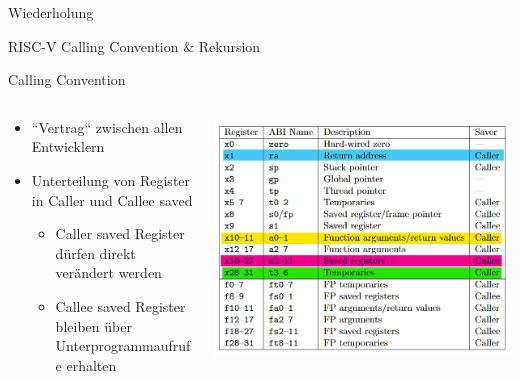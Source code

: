 \documentclass[
  german,            %
  aspectratio=169,    %
]{tumbeamer}
\begin{document}
\begin{frame}[c]{Wiederholung}{}
	\begin{center}
	  \LARGE RISC-V Calling Convention \& Rekursion
	\end{center}
\end{frame}

\begin{frame}[c]{Calling Convention}
	\begin{columns}[c]
	  \begin{column}{0.5\textwidth}
		\begin{itemize}
		  \item ``Vertrag`` zwischen allen Entwicklern
		  \item Unterteilung von Register in Caller und Callee saved
		  \begin{itemize}
			\item Caller saved Register dürfen direkt verändert werden
			\item Callee saved Register bleiben über Unterprogrammaufrufe erhalten
		  \end{itemize} 
		\end{itemize}
	  \end{column}
	  \begin{column}{0.5\textwidth}
		\includegraphics[width=\linewidth]{w03_calling_conv_regs.png}
	  \end{column}
	\end{columns}
  \end{frame}
  
\end{document}
